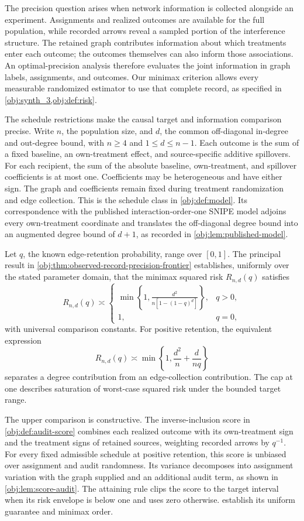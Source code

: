 The precision question arises when network information is collected alongside an experiment. Assignments and realized outcomes are available for the full population, while recorded arrows reveal a sampled portion of the interference structure. The retained graph contributes information about which treatments enter each outcome; the outcomes themselves can also inform those associations. An optimal-precision analysis therefore evaluates the joint information in graph labels, assignments, and outcomes. Our minimax criterion allows every measurable randomized estimator to use that complete record, as specified in \cref{obj:synth_3,obj:def:risk}.

The schedule restrictions make the causal target and information comparison precise. Write \(n\), the population size, and \(d\), the common off-diagonal in-degree and out-degree bound, with \(n\ge4\) and \(1\le d\le n-1\). Each outcome is the sum of a fixed baseline, an own-treatment effect, and source-specific additive spillovers. For each recipient, the sum of the absolute baseline, own-treatment, and spillover coefficients is at most one. Coefficients may be heterogeneous and have either sign. The graph and coefficients remain fixed during treatment randomization and edge collection. This is the schedule class in \cref{obj:def:model}. Its correspondence with the published interaction-order-one SNIPE model adjoins every own-treatment coordinate and translates the off-diagonal degree bound into an augmented degree bound of \(d+1\), as recorded in \cref{obj:lem:published-model}.

Let \(q\), the known edge-retention probability, range over \([0,1]\). The principal result in \cref{obj:thm:observed-record-precision-frontier} establishes, uniformly over the stated parameter domain, that the minimax squared risk \(R_{n,d}(q)\) satisfies
\[
R_{n,d}(q)\asymp
\begin{cases}
\displaystyle
\min\left\{1,\frac{d^2}{n[1-(1-q)^d]}\right\},&q>0,\\[6pt]
1,&q=0,
\end{cases}
\]
with universal comparison constants. For positive retention, the equivalent expression
\[
R_{n,d}(q)\asymp
\min\left\{1,\frac{d^2}{n}+\frac{d}{nq}\right\}
\]
separates a degree contribution from an edge-collection contribution. The cap at one describes saturation of worst-case squared risk under the bounded target range.

The upper comparison is constructive. The inverse-inclusion score in \cref{obj:def:audit-score} combines each realized outcome with its own-treatment sign and the treatment signs of retained sources, weighting recorded arrows by \(q^{-1}\). For every fixed admissible schedule at positive retention, this score is unbiased over assignment and audit randomness. Its variance decomposes into assignment variation with the graph supplied and an additional audit term, as shown in \cref{obj:lem:score-audit}. The attaining rule clips the score to the target interval when its risk envelope is below one and uses zero otherwise.  establish its uniform guarantee and minimax order.

